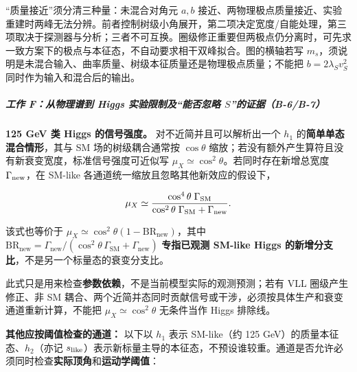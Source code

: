\documentclass[
]{article}
\begin{document}
``质量接近''须分清三种量：未混合对角元 \(a,b\)
接近、两物理极点质量接近、实验重建时两峰无法分辨。前者控制树级小角展开，第二项决定宽度/自能处理，第三项取决于探测器与分析；三者不可互换。圈级修正重要但两极点仍分离时，可先求一致方案下的极点与本征态，不自动要求相干双峰拟合。图的横轴若写
\(m_s\)，须说明是未混合输入、曲率质量、树级本征质量还是物理极点质量；不能把
\(b=2\lambda_Sv_S^2\) 同时作为输入和混合后的输出。

\subparagraph{\texorpdfstring{工作 F：从物理谱到 Higgs
实验限制及``能否忽略
\(S\)''的证据（B-6/B-7）}{工作 F：从物理谱到 Higgs 实验限制及``能否忽略 S''的证据（B-6/B-7）}}\label{ux5de5ux4f5c-fux4eceux7269ux7406ux8c31ux5230-higgs-ux5b9eux9a8cux9650ux5236ux53caux80fdux5426ux5ffdux7565-sux7684ux8bc1ux636eb-6b-7}

\textbf{125 GeV 类 Higgs 的信号强度。} 对不近简并且可以解析出一个
\(h_1\) 的\textbf{简单单态混合情形}，其与 SM 场的树级耦合通常按
\(\cos\theta\)
缩放；若没有额外产生算符且没有新衰变宽度，标准信号强度可近似写
\(\mu_X\simeq\cos^2\theta\)。若同时存在新增总宽度
\(\Gamma_{\rm new}\)，在 SM-like
各通道统一缩放且忽略其他新效应的假设下，

\[
 \mu_X\simeq\frac{\cos^4\theta\;\Gamma_{\rm SM}}
 {\cos^2\theta\;\Gamma_{\rm SM}+\Gamma_{\rm new}}.
\]

该式也等价于
\(\mu_X\simeq\cos^2\theta(1-\mathrm{BR}_{\mathrm{new}})\)，其中
\(\mathrm{BR}_{\mathrm{new}}=\Gamma_{\mathrm{new}}/(\cos^2\theta\,\Gamma_{\mathrm{SM}}+\Gamma_{\mathrm{new}})\)
\textbf{专指已观测 SM-like Higgs
的新增分支比}，不是另一个标量态的衰变分支比。

此式只是用来检查\textbf{参数依赖}，不是当前模型实际的观测预测；若有 VLL
圈级产生修正、非 SM
耦合、两个近简并态同时贡献信号或干涉，必须按具体生产和衰变通道重新计算，不能把
\(\mu_X\simeq\cos^2\theta\) 无条件当作 Higgs 排除线。

\textbf{其他应按阈值检查的通道：} 以下以 \(h_1\) 表示 SM-like（约 125
GeV）的质量本征态、\(h_2\)（亦记
\(s_{\rm like}\)）表示新标量主导的本征态，不预设谁较重。通道是否允许必须同时检查\textbf{实际顶角}和\textbf{运动学阈值}：
\end{document}
